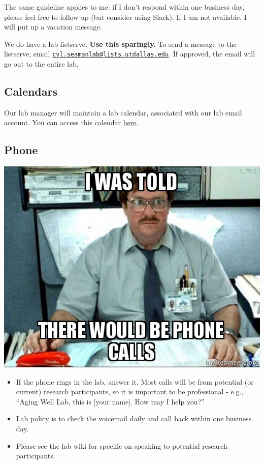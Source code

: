 \documentclass[]{book}
\begin{document}
The same guideline applies to me: if I don't respond within one business day, please feel free to follow up (but consider using Slack). If I am not available, I will put up a vacation message.

We do have a lab listserve. \textbf{Use this sparingly.} To send a message to the listserve, email \href{mailto:cvl.seamanlab@lists.utdallas.edu}{\nolinkurl{cvl.seamanlab@lists.utdallas.edu}}. If approved, the email will go out to the entire lab.

\hypertarget{calendars}{%
\subsection{Calendars}\label{calendars}}

Our lab manager will maintain a lab calendar, associated with our lab email account. You can access this calendar \href{https://calendar.google.com/calendar/embed?src=agingwelllab\%40gmail.com\&ctz=America\%2FNew_York}{here}.

\hypertarget{phone}{%
\subsection{Phone}\label{phone}}

\includegraphics{images/phonecalls.jpg}

\begin{itemize}
\item
  If the phone rings in the lab, answer it. Most calls will be from potential (or current) research participants, so it is important to be professional - e.g., ``Aging Well Lab, this is {[}your name{]}. How may I help you?''
\item
  Lab policy is to check the voicemail daily and call back within one business day.
\item
  Please see the lab wiki for specific on speaking to potential research participants.
\end{itemize}
\end{document}
